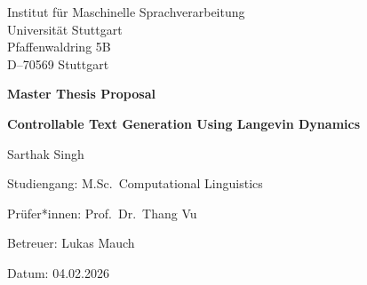 \documentclass[11pt]{article}
\begin{document}
\begin{titlepage}
    \centering

    {\large Institut für Maschinelle Sprachverarbeitung\\}
    {\large Universität Stuttgart\\}
    {\large Pfaffenwaldring 5B\\}
    {\large D--70569 Stuttgart\\}

    \vspace{2.5cm}

    {\Large\bfseries Master Thesis Proposal\par}

    \vspace{2cm}

    {\Huge\bfseries Controllable Text Generation Using Langevin Dynamics\par}
    \vspace{0.1cm}

    \vspace{2.5cm}

    {\Large Sarthak Singh\par}

    \vspace{1.5cm}

    {\large Studiengang: M.Sc.\ Computational Linguistics\par}

    \vspace{1.5cm}

    {\large Prüfer*innen: Prof.\ Dr.\ Thang Vu\par}
    \vspace{0.5cm}
    {\large Betreuer: Lukas Mauch\par}
    \vspace{0.5cm}
    {\large Datum: 04.02.2026 \par}

    \vfill
\end{titlepage}


\end{document}
